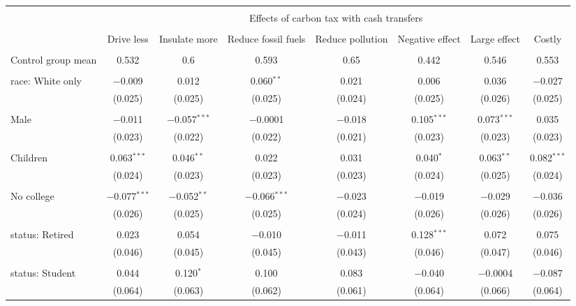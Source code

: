
\begin{tabular}{@{\extracolsep{5pt}}lccccccc} 
\\[-1.8ex]\hline 
\hline \\[-1.8ex] 
 & \multicolumn{7}{c}{Effects of carbon tax with cash transfers} \\ 
\cline{2-8} 
\\[-1.8ex] & Drive less & Insulate more & Reduce fossil fuels & Reduce pollution & Negative effect & Large effect & Costly \\ 
\hline \\[-1.8ex] 
 Control group mean & 0.532 & 0.6 & 0.593 & 0.65 & 0.442 & 0.546 & 0.553  \\ \hline \\[-1.8ex] race: White only & $-$0.009 & 0.012 & 0.060$^{**}$ & 0.021 & 0.006 & 0.036 & $-$0.027 \\ 
  & (0.025) & (0.025) & (0.025) & (0.024) & (0.025) & (0.026) & (0.025) \\ 
  & & & & & & & \\ 
 Male & $-$0.011 & $-$0.057$^{***}$ & $-$0.0001 & $-$0.018 & 0.105$^{***}$ & 0.073$^{***}$ & 0.035 \\ 
  & (0.023) & (0.022) & (0.022) & (0.021) & (0.023) & (0.023) & (0.023) \\ 
  & & & & & & & \\ 
 Children & 0.063$^{***}$ & 0.046$^{**}$ & 0.022 & 0.031 & 0.040$^{*}$ & 0.063$^{**}$ & 0.082$^{***}$ \\ 
  & (0.024) & (0.023) & (0.023) & (0.023) & (0.024) & (0.025) & (0.024) \\ 
  & & & & & & & \\ 
 No college & $-$0.077$^{***}$ & $-$0.052$^{**}$ & $-$0.066$^{***}$ & $-$0.023 & $-$0.019 & $-$0.029 & $-$0.036 \\ 
  & (0.026) & (0.025) & (0.025) & (0.024) & (0.026) & (0.026) & (0.026) \\ 
  & & & & & & & \\ 
 status: Retired & 0.023 & 0.054 & $-$0.010 & $-$0.011 & 0.128$^{***}$ & 0.072 & 0.075 \\ 
  & (0.046) & (0.045) & (0.045) & (0.043) & (0.046) & (0.047) & (0.046) \\ 
  & & & & & & & \\ 
 status: Student & 0.044 & 0.120$^{*}$ & 0.100 & 0.083 & $-$0.040 & $-$0.0004 & $-$0.087 \\ 
  & (0.064) & (0.063) & (0.062) & (0.061) & (0.064) & (0.066) & (0.064) \\ 

\end{tabular}
